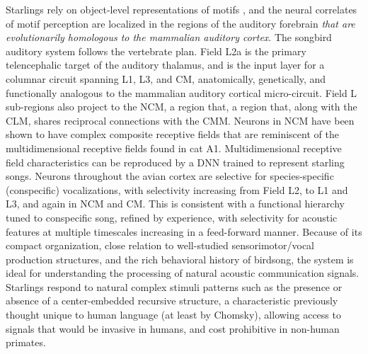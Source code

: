 Starlings rely on object-level representations of motifs \cite{Meliza2010,gentner1998perceptual,Comins2013,comins2014auditory}, and the neural correlates of motif perception are localized in the regions of the auditory forebrain \emph{that are evolutionarily homologous to the mammalian auditory cortex\cite{wang2010laminar}}. The songbird auditory system follows the vertebrate plan\cite{Carr1992}. Field L2a is the primary telencephalic target of the auditory thalamus\cite{Karten1968}, and is the input layer for a columnar circuit spanning L1, L3, and \ac{CM}, anatomically\cite{Wang2010a,Jarvis2005}, genetically\cite{Dugas-Ford2012}, and functionally\cite{Calabrese2015} analogous to the mammalian auditory cortical micro-circuit. Field L sub-regions also project to the \ac{NCM}, a region that, a region that, along with the \ac{CLM}, shares reciprocal connections with the \ac{CMM}. Neurons in \ac{NCM} have been shown to have complex composite receptive fields\cite{kozlov2016central} that are reminiscent of the multidimensional receptive fields found in cat A1\cite{atencio2008cooperative}. Multidimensional receptive field characteristics can be reproduced by a \ac{DNN}\cite{kozlov2016central} trained to represent starling songs. Neurons throughout the avian cortex are selective for species-specific (conspecific) vocalizations\cite{Bonke1979,Leppelsack1976,Muller1985}, with selectivity increasing from Field L2, to L1 and L3\cite{Theunissen2004,Theunissen1998,Theunissen2000}, and again in \ac{NCM} and \ac{CM}\cite{Calabrese2015,Muller1985,Grace2003,Bonke1979,Leppelsack1976,gentner2003neuronal,Gentner2004,Thompson2010,Jeanne2011}. This is consistent with a functional hierarchy tuned to conspecific song\cite{Hsu2004,Woolley2005}, refined by experience\cite{gentner2003neuronal,Sockman2002,Sockman2005,Phan2006,Thompson2010,Jeanne2011}, with selectivity for acoustic features at multiple timescales increasing in a feed-forward manner\cite{Rose1988,Kaas2000,Binder2000,VanEssen1992}. Because of its compact organization, close relation to well-studied sensorimotor/vocal production structures, and the rich behavioral history of birdsong, the system is ideal for understanding the processing of natural acoustic communication signals.
Starlings respond to natural complex stimuli patterns such as the presence or absence of a center-embedded recursive structure\cite{gentner2006recursive,comins2014auditory,comins2014temporal}, a characteristic previously thought unique to human language (at least by Chomsky), allowing access to signals that would be invasive in humans, and cost prohibitive in non-human primates.

